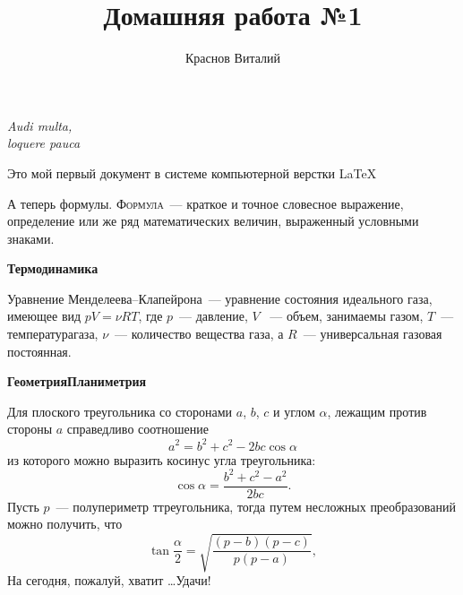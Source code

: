 \documentclass[12pt]{article}
\title{Домашняя работа №1}
\author{Краснов Виталий}
\date{}
\begin{document}
	\maketitle
	\begin{flushright}
		\itshape{Audi multa,\\loquere pauca}
	\end{flushright}
		\vspace{20pt}
		Это мой первый документ в системе компьютерной верстки \LaTeX
	\begin{center}
		\huge{}
	\end{center}
	 
	А теперь формулы. \textsc{Формула}~--- краткое и точное словесное выражение, определение или же ряд математических величин, выраженный условными знаками.
	
	\vspace{15pt}
	\hspace{28pt}\textbf{\large{Термодинамика}}
	
	Уравнение Менделеева--Клапейрона~--- уравнение состояния идеального газа, имеющее вид $pV = \nu RT$, где $p$~--- давление, $V$~ --- объем, занимаемы газом, $T$~---температурагаза, $\nu$~--- количество вещества газа, а $R$~--- универсальная газовая постоянная.
	
	\vspace{15pt}
	\hspace{28pt}\textbf{\large{Геометрия\hfill Планиметрия}}
	
	 Для плоского треугольника со сторонами $a$, $b$, $c$ и углом $\alpha$, лежащим против стороны $a$ справедливо соотношение $$ a^2 = b^2 + c^2 - 2bc\cos\alpha $$ из которого можно выразить косинус угла треугольника: $$ \cos\alpha = \frac{b^2 + c^2 - a^2}{2bc}. $$
	 Пусть $p$~--- полупериметр ттреугольника, тогда путем несложных преобразований можно получить, что $$ \tan\frac{\alpha}{2} =  \sqrt{\frac{(p - b)(p - c)}{p(p - a)}}, $$ \vspace{1cm} На сегодня, пожалуй, хватит \dots Удачи!
\end{document}
